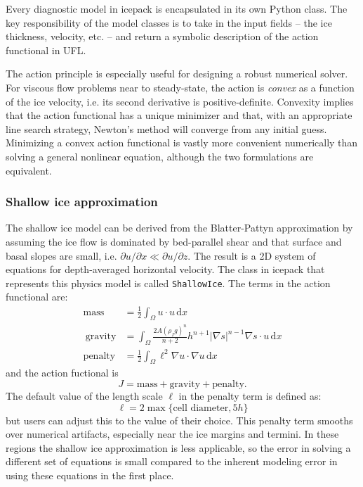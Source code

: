 \documentclass{article}
\theoremstyle{definition}
\theoremstyle{plain}
\newcommand{\ud}{\hspace{2pt}\mathrm{d}}
\begin{document}
Every diagnostic model in icepack is encapsulated in its own Python class.
The key responsibility of the model classes is to take in the input fields -- the ice thickness, velocity, etc. -- and return a symbolic description of the action functional in UFL.

The action principle is especially useful for designing a robust numerical solver.
For viscous flow problems near to steady-state, the action is \emph{convex} as a function of the ice velocity, i.e. its second derivative is positive-definite.
Convexity implies that the action functional has a unique minimizer and that, with an appropriate line search strategy, Newton's method will converge from any initial guess.
Minimizing a convex action functional is vastly more convenient numerically than solving a general nonlinear equation, although the two formulations are equivalent.

\subsubsection{Shallow ice approximation}

The shallow ice model can be derived from the Blatter-Pattyn approximation by assuming the ice flow is dominated by bed-parallel shear and that surface and basal slopes are small, i.e. $\partial u/\partial x \ll \partial u/\partial z$.
The result is a 2D system of equations for depth-averaged horizontal velocity.
The class in icepack that represents this physics model is called \texttt{ShallowIce}.
The terms in the action functional are:
\begin{align}
    \text{mass} & =\frac{1}{2}\int_\Omega u\cdot u\ud x\\\
    \text{gravity} & = \int_\Omega\frac{2A(\rho_I g)^n}{n+2} h^{n + 1}|\nabla s|^{n - 1}\nabla s\cdot u\ud x\\
    \text{penalty} & = \frac{1}{2}\int_\Omega \ell^2\nabla u\cdot \nabla u\ud x
\end{align}
and the action fuctional is
\begin{equation}
    J = \text{mass} + \text{gravity} + \text{penalty}.
\end{equation}
The default value of the length scale $\ell$ in the penalty term is defined as:
\begin{equation}
    \ell = 2\max\{\text{cell diameter}, 5h\}
\end{equation}
but users can adjust this to the value of their choice.
This penalty term smooths over numerical artifacts, especially near the ice margins and termini.
In these regions the shallow ice approximation is less applicable, so the error in solving a different set of equations is small compared to the inherent modeling error in using these equations in the first place.
\end{document}
